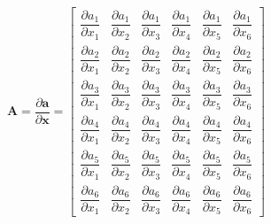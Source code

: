 \begin{equation}
	\boldsymbol A = \dfrac{\partial \boldsymbol a}{\partial \boldsymbol x} =
	\begin{bmatrix}
		\dfrac{\partial  a_1}{\partial  x_1}&
		\dfrac{\partial  a_1}{\partial  x_2}&
		\dfrac{\partial  a_1}{\partial  x_3}&
		\dfrac{\partial  a_1}{\partial  x_4}&
		\dfrac{\partial  a_1}{\partial  x_5}&
		\dfrac{\partial  a_1}{\partial  x_6}
		\\[1em]
		\dfrac{\partial  a_2}{\partial  x_1}&
		\dfrac{\partial  a_2}{\partial  x_2}&
		\dfrac{\partial  a_2}{\partial  x_3}&
		\dfrac{\partial  a_2}{\partial  x_4}&
		\dfrac{\partial  a_2}{\partial  x_5}&
		\dfrac{\partial  a_2}{\partial  x_6}
		\\[1em]
		\dfrac{\partial  a_3}{\partial  x_1}&
		\dfrac{\partial  a_3}{\partial  x_2}&
		\dfrac{\partial  a_3}{\partial  x_3}&
		\dfrac{\partial  a_3}{\partial  x_4}&
		\dfrac{\partial  a_3}{\partial  x_5}&
		\dfrac{\partial  a_3}{\partial  x_6}
		\\[1em]
		\dfrac{\partial  a_4}{\partial  x_1}&
		\dfrac{\partial  a_4}{\partial  x_2}&
		\dfrac{\partial  a_4}{\partial  x_3}&
		\dfrac{\partial  a_4}{\partial  x_4}&
		\dfrac{\partial  a_4}{\partial  x_5}&
		\dfrac{\partial  a_4}{\partial  x_6}
		\\[1em]
		\dfrac{\partial  a_5}{\partial  x_1}&
		\dfrac{\partial  a_5}{\partial  x_2}&
		\dfrac{\partial  a_5}{\partial  x_3}&
		\dfrac{\partial  a_5}{\partial  x_4}&
		\dfrac{\partial  a_5}{\partial  x_5}&
		\dfrac{\partial  a_5}{\partial  x_6}
		\\[1em]
		\dfrac{\partial  a_6}{\partial  x_1}&
		\dfrac{\partial  a_6}{\partial  x_2}&
		\dfrac{\partial  a_6}{\partial  x_3}&
		\dfrac{\partial  a_6}{\partial  x_4}&
		\dfrac{\partial  a_6}{\partial  x_5}&
		\dfrac{\partial  a_6}{\partial  x_6}
	\end{bmatrix}
\end{equation}
